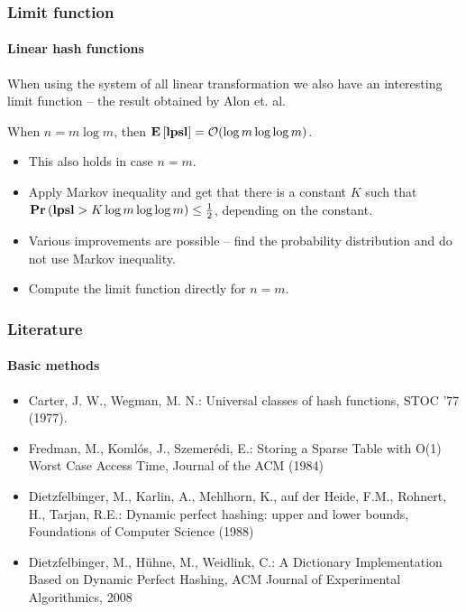 \begin{frame}
	\frametitle{Limit function}
	\framesubtitle{Linear hash functions}
	
	When using the system of all linear transformation we also have an interesting limit function -- the result obtained by Alon et. al.

	\begin{theorem}
	When $n = m \log m$, then $\mathbf{E}\left[\mathbf{lpsl}\right] = \mathcal{O}(\log m \log \log m)$.
	\end{theorem}
	
	\begin{itemize}
		\item This also holds in case $n = m$.
		\item Apply Markov inequality and get that there is a constant $K$ such that $\mathbf{Pr}\left(\mathbf{lpsl} > K \log m \log \log m\right) \leq \frac{1}{2}$, depending on the constant.
		\item Various improvements are possible -- find the probability distribution and do not use Markov inequality.
		\item Compute the limit function directly for $n = m$.
	\end{itemize}
\end{frame}

\begin{frame}
	\frametitle{Literature}
	\framesubtitle{Basic methods}
	
	\begin{itemize}	
		\item Carter, J. W., Wegman, M. N.: Universal classes of hash functions, STOC '77 (1977).
		\item Fredman, M., Komlós, J., Szemerédi, E.: Storing a Sparse Table with O(1) Worst Case Access Time, Journal of the ACM (1984)
		\item Dietzfelbinger, M., Karlin, A., Mehlhorn, K., auf der Heide, F.M., Rohnert, H., Tarjan, R.E.: Dynamic perfect hashing: upper and lower bounds, Foundations of Computer Science (1988)
		\item Dietzfelbinger, M., Hühne, M., Weidlink, C.: A Dictionary Implementation Based on Dynamic Perfect Hashing, ACM Journal of Experimental Algorithmics, 2008
	\end{itemize}
\end{frame}

